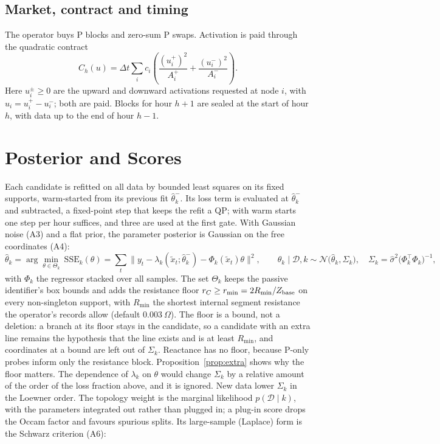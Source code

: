 \documentclass[journal,onecolumn,11pt]{IEEEtran}
\newcommand{\tp}{^{\top}}
\newcommand{\Nrm}{\mathcal{N}}
\begin{document}
\subsection{Market, contract and timing}
The operator buys P blocks and zero-sum P swaps. Activation is paid through the quadratic contract
\begin{equation}\label{eq:contract}
C_h(u)=\Delta t\sum_i c_i\left(\frac{(u_i^+)^2}{A_i^+}+\frac{(u_i^-)^2}{A_i^-}\right).
\end{equation}
Here $u_i^\pm\ge0$ are the upward and downward activations requested at node $i$, with $u_i=u_i^+-u_i^-$; both are paid. Blocks for hour $h+1$ are sealed at the start of hour $h$, with data up to the end of hour $h-1$.

\section{Posterior and Scores}
Each candidate is refitted on all data by bounded least squares on its fixed supports, warm-started from its previous fit $\hat\theta_k^-$. Its loss term is evaluated at $\hat\theta_k^-$ and subtracted, a fixed-point step that keeps the refit a QP; with warm starts one step per hour suffices, and three are used at the first gate. With Gaussian noise (A3) and a flat prior, the parameter posterior is Gaussian on the free coordinates (A4):
\begin{equation}\label{eq:refit}
\hat\theta_k=\arg\min_{\theta\in\Theta_k}\ \mathrm{SSE}_k(\theta)=\sum_t\big\|y_t-\lambda_k(\tilde x_t;\hat\theta_k^-)-\Phi_k(\tilde x_t)\theta\big\|^2,\qquad
\theta_k\mid\mathcal D,k\sim\Nrm\big(\hat\theta_k,\Sigma_k\big),\quad
\Sigma_k=\hat\sigma^2\big(\Phi_k\tp\Phi_k\big)^{-1},
\end{equation}
with $\Phi_k$ the regressor stacked over all samples. The set $\Theta_k$ keeps the passive identifier's box bounds and adds the resistance floor $r_C\ge r_{\min}=2R_{\min}/Z_{\rm base}$ on every non-singleton support, with $R_{\min}$ the shortest internal segment resistance the operator's records allow (default $0.003~\Omega$). The floor is a bound, not a deletion: a branch at its floor stays in the candidate, so a candidate with an extra line remains the hypothesis that the line exists and is at least $R_{\min}$, and coordinates at a bound are left out of $\Sigma_k$. Reactance has no floor, because P-only probes inform only the resistance block. Proposition~\ref{prop:extra} shows why the floor matters. The dependence of $\lambda_k$ on $\theta$ would change $\Sigma_k$ by a relative amount of the order of the loss fraction above, and it is ignored. New data lower $\Sigma_k$ in the Loewner order. The topology weight is the marginal likelihood $p(\mathcal D\mid k)$, with the parameters integrated out rather than plugged in; a plug-in score drops the Occam factor and favours spurious splits. Its large-sample (Laplace) form is the Schwarz criterion \cite{schwarz1978} (A6):
\end{document}
